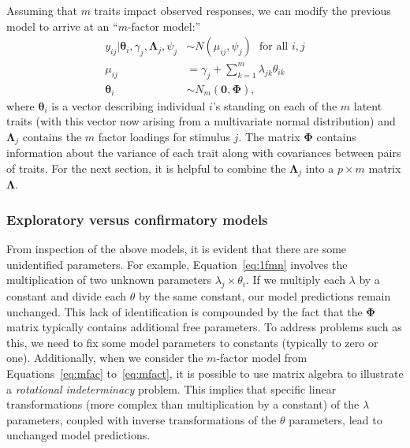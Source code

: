 Assuming that $m$ traits impact observed responses, we can modify the previous model to arrive at an ``$m$-factor model:''
\begin{align} \label{eq:mfac}
    y_{ij} | \bm{\theta}_i, \gamma_j, \bm{\Lambda}_j, \psi_j &\sim N(\mu_{ij}, \psi_j)\ \ \ \text{for all }i,j \\ \label{eq:mfac2}
    \mu_{ij} &= \gamma_j + \displaystyle \sum_{k=1}^m \lambda_{jk} \theta_{ik} \\ \label{eq:mfact}
    \bm{\theta}_i &\sim N_m(\bm{0}, \bm{\Phi}),
\end{align}
where $\bm{\theta}_i$ is a vector describing individual $i$'s standing on each of the $m$ latent traits (with this vector now arising from a multivariate normal distribution) and $\bm{\Lambda}_j$ contains the $m$ factor loadings for stimulus $j$.  The matrix $\bm{\Phi}$ contains information about the variance of each trait along with covariances between pairs of traits.  For the next section, it is helpful to combine the $\bm{\Lambda}_j$ into a $p \times m$ matrix $\bm{\Lambda}$.  

\subsubsection{Exploratory versus confirmatory models} \label{sec:id}

From inspection of the above models, it is evident that there are some unidentified parameters.  For example, Equation~\eqref{eq:1fmn} involves the multiplication of two unknown parameters $\lambda_j \times \theta_i$.  If we multiply each $\lambda$ by a constant and divide each $\theta$ by the same constant, our model predictions remain unchanged.  This lack of identification is compounded by the fact that the $\bm{\Phi}$ matrix typically contains additional free parameters. To address problems such as this, we need to fix some model parameters to constants (typically to zero or one). Additionally, when we consider the $m$-factor model from Equations~\eqref{eq:mfac} to~\eqref{eq:mfact}, it is possible to use matrix algebra to illustrate a {\em rotational indeterminacy} problem. This implies that specific linear transformations (more complex than multiplication by a constant) of the $\lambda$ parameters, coupled with inverse transformations of the $\theta$ parameters, lead to unchanged model predictions.  

